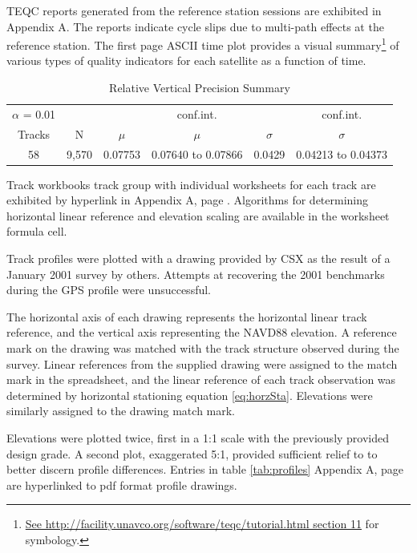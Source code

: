 TEQC reports generated from the reference station sessions are exhibited in Appendix A. The reports indicate cycle slips due to multi-path effects at the reference station. The first page ASCII time plot provides a visual summary\footnote{\href{http://facility.unavco.org/software/teqc/tutorial.html}{See http://facility.unavco.org/software/teqc/tutorial.html section 11} for symbology.} of various types of quality indicators for each satellite as a function of time.

\begin{table}[ht]
	\begin{center}
	\caption{Relative Vertical Precision Summary}
	\label{tab:relVertPrec}
	\begin{tabular}{c c c c c c}
	\toprule
	$\alpha$ = 0.01&&&conf.int.&&conf.int.\\
	Tracks & N & $\mu$ &$\mu$& $\sigma$&$\sigma$\\
	\midrule
	58 & 9,570 & 0.07753 & 0.07640 to 0.07866 & 0.0429 & 0.04213 to 0.04373\\
	\bottomrule
	\end{tabular}
	\end{center}
\end{table}

Track workbooks track group with individual worksheets for each track are exhibited by hyperlink in Appendix A, page \pageref{tab:profiles}. Algorithms for determining horizontal linear reference and elevation scaling are available in the worksheet formula cell.

Track profiles were plotted with a drawing provided by CSX as the result of a January 2001 survey by others. Attempts at recovering the 2001 benchmarks during the GPS profile were unsuccessful.

The horizontal axis of each drawing represents the horizontal linear track reference, and the vertical axis representing the NAVD88 elevation. A reference mark on the drawing was matched with the track structure observed during the survey. Linear references from the supplied drawing were assigned to the match mark in the spreadsheet, and the linear reference of each track observation was determined by horizontal stationing equation \ref{eq:horzSta}. Elevations were similarly assigned to the drawing match mark.

Elevations were plotted twice, first in a 1:1 scale with the previously provided design grade. A second plot, exaggerated 5:1, provided sufficient relief to to better discern profile differences. Entries in table \ref{tab:profiles} Appendix A, page \pageref{tab:profiles} are hyperlinked to pdf format profile drawings. 

